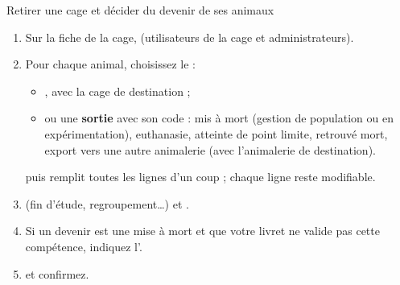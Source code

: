 \documentclass[11pt,a4paper]{article}
\begin{document}
\begin{procedure}{Retirer une cage et décider du devenir de ses animaux}
\begin{enumerate}
  \item Sur la fiche de la cage,  (utilisateurs de la
    cage et administrateurs).
  \item Pour chaque animal, choisissez le  :
    \begin{itemize}
      \item {}, avec la cage de destination ;
      \item ou une \textbf{sortie} avec son code : mis à mort (gestion de
        population ou en expérimentation), euthanasie, atteinte de point
        limite, retrouvé mort, export vers une autre animalerie (avec
        l'animalerie de destination).
    \end{itemize}
     puis  remplit toutes les lignes d'un coup ; chaque ligne reste
    modifiable.
  \item {} (fin d'étude, regroupement…) et
    .
  \item Si un devenir est une mise à mort et que votre livret ne valide pas
    cette compétence, indiquez l'.
  \item {} et confirmez.
\end{enumerate}
\end{procedure}
\end{document}

